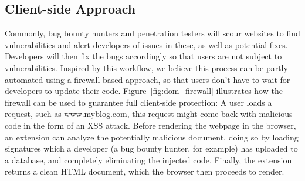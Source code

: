 \subsection{Client-side Approach}
 Commonly, bug bounty hunters and penetration testers will scour websites to find vulnerabilities and alert developers of issues in these, as well as potential fixes. Developers will then fix the bugs accordingly so that users are not subject to vulnerabilities. Inspired by this workflow, we believe this process can be partly automated using a firewall-based approach, so that users don't have to wait for developers to update their code. Figure~\ref{fig:dom_firewall} illustrates how the firewall can be used to guarantee full client-side protection: A user loads a request, such as www.myblog.com, this request might come back with malicious code in the form of an XSS attack. Before rendering the webpage in the browser, an extension can analyze the potentially malicious document, doing so by loading signatures which a developer (a bug bounty hunter, for example) has uploaded to a database, and completely eliminating the injected code. Finally, the extension returns a clean HTML document, which the browser then proceeds to render.

